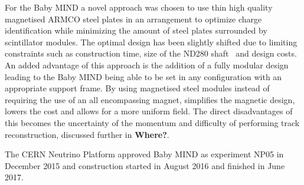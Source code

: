 For the Baby MIND a novel approach was chosen to use thin high quality magnetised ARMCO steel plates in an arrangement to optimize charge identification while minimizing the amount of steel plates surrounded by scintillator modules. The optimal design has been slightly shifted due to limiting constraints such as construction time, size of the ND280 shaft~\cite{21T2K} and design costs. An added advantage of this approach is the addition of a fully modular design leading to the Baby MIND being able to be set in any configuration with an appropriate support frame. By using magnetised steel modules instead of requiring the use of an all encompassing magnet, simplifies the magnetic design, lowers the cost and allows for a more uniform field. The direct disadvantages of this becomes the uncertainty of the momentum and difficulty of performing track reconstruction, discussed further in \textbf{Where?}.

The CERN Neutrino Platform approved Baby MIND as experiment NP05 in December 2015 and construction started in August 2016 and finished in June 2017. 






